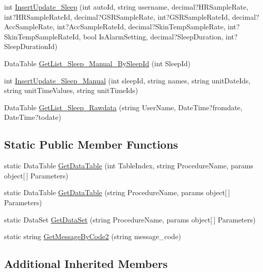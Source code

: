\begin{DoxyCompactItemize}
\item 
int \hyperlink{class_d_b_class_a00b39101f9f39e20fc7e10307ab3c06f}{Insert\-Update\-\_\-\-Sleep} (int auto\-Id, string username, decimal?H\-R\-Sample\-Rate, int?H\-R\-Sample\-Rate\-Id, decimal?G\-S\-R\-Sample\-Rate, int?G\-S\-R\-Sample\-Rate\-Id, decimal?Acc\-Sample\-Rate, int?Acc\-Sample\-Rate\-Id, decimal?Skin\-Temp\-Sample\-Rate, int?Skin\-Temp\-Sample\-Rate\-Id, bool Is\-Alarm\-Setting, decimal?Sleep\-Duration, int?Sleep\-Duration\-Id)
\item 
Data\-Table \hyperlink{class_d_b_class_a0e2606c8a08dfa94868f871b6ab8f848}{Get\-List\-\_\-\-Sleep\-\_\-\-Manual\-\_\-\-By\-Sleep\-Id} (int Sleep\-Id)
\item 
int \hyperlink{class_d_b_class_a68f701aa5999c1bdc92e2d880b7d41af}{Insert\-Update\-\_\-\-Sleep\-\_\-\-Manual} (int sleep\-Id, string names, string unit\-Date\-Ids, string unit\-Time\-Values, string unit\-Time\-Ids)
\item 
Data\-Table \hyperlink{class_d_b_class_ae619d8b6adac22347a9b9a302d45a5f5}{Get\-List\-\_\-\-Sleep\-\_\-\-Rawdata} (string User\-Name, Date\-Time?fromdate, Date\-Time?todate)
\end{DoxyCompactItemize}
\subsection*{Static Public Member Functions}
\begin{DoxyCompactItemize}
\item 
static Data\-Table \hyperlink{class_d_b_class_ab3e7318b0c12986f5b4bbf566a1aec32}{Get\-Data\-Table} (int Table\-Index, string Procedure\-Name, params object\mbox{[}$\,$\mbox{]} Parameters)
\item 
static Data\-Table \hyperlink{class_d_b_class_a7ba7be30e81075831d240a4c905ac650}{Get\-Data\-Table} (string Procedure\-Name, params object\mbox{[}$\,$\mbox{]} Parameters)
\item 
static Data\-Set \hyperlink{class_d_b_class_a4061cee8189ba6ee8c6ebf19be8567dc}{Get\-Data\-Set} (string Procedure\-Name, params object\mbox{[}$\,$\mbox{]} Parameters)
\item 
static string \hyperlink{class_d_b_class_a2d0699b41086dd4e043fa2c653543f94}{Get\-Message\-By\-Code2} (string message\-\_\-code)
\end{DoxyCompactItemize}
\subsection*{Additional Inherited Members}


